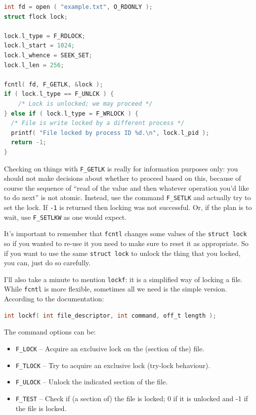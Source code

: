 \begin{lstlisting}[language=C]
int fd = open ( "example.txt", O_RDONLY );
struct flock lock;

lock.l_type = F_RDLOCK;
lock.l_start = 1024;
lock.l_whence = SEEK_SET;
lock.l_len = 256;

fcntl( fd, F_GETLK, &lock );
if ( lock.l_type == F_UNLCK ) {
	/* Lock is unlocked; we may proceed */
} else if ( lock.l_type = F_WRLOCK ) {
  /* File is write locked by a different process */
  printf( "File locked by process ID %d.\n", lock.l_pid );
  return -1;
}
\end{lstlisting}

Checking on things with \texttt{F\_GETLK} is really for information purposes only: you should not make decisions about whether to proceed based on this, because of course the sequence of ``read of the value and then whatever operation you'd like to do next'' is not atomic. Instead, use the command \texttt{F\_SETLK} and actually try to set the lock. If \texttt{-1} is returned then locking was not successful. Or, if the plan is to wait, use \texttt{F\_SETLKW} as one would expect.

It's important to remember that \texttt{fcntl} changes some values of the \texttt{struct lock} so if you wanted to re-use it you need to make sure to reset it as appropriate. So if you want to use the same \texttt{struct lock} to unlock the thing that you locked, you can, just do so carefully.

I'll also take a minute to mention \texttt{lockf}: it is a simplified way of locking a file. While \texttt{fcntl} is more flexible, sometimes all we need is the simple version. According to the documentation:

\begin{lstlisting}[language=C]
int lockf( int file_descriptor, int command, off_t length );
\end{lstlisting}

The command options can be:
\begin{itemize}
	\item \texttt{F\_LOCK} -- Acquire an exclusive lock on the (section of the) file.
	\item \texttt{F\_TLOCK} -- Try to acquire an exclusive lock (try-lock behaviour).
	\item \texttt{F\_ULOCK} -- Unlock the indicated section of the file.
	\item \texttt{F\_TEST} -- Check if (a section of) the file is locked; 0 if it is unlocked and -1 if the file is locked.
\end{itemize}


